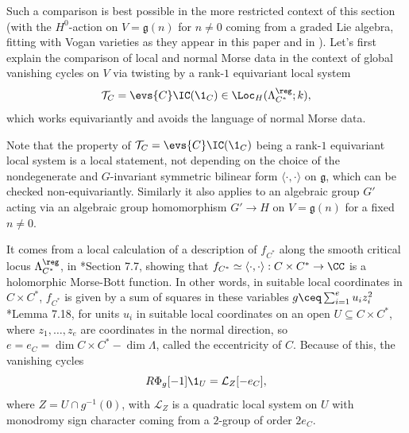 \documentclass[11pt,letterpaper]{amsart}
\numberwithin{equation}{section}
\begin{document}
Such a comparison is best possible in the more restricted context of this section
(with the $H^0$-action on $V= \mathfrak{g}(n)$ for $n \ne 0$ coming from a graded Lie algebra, fitting with Vogan varieties as they appear in this paper and in \cite{CFMMX22}).
Let's first explain the comparison of local and normal Morse data in the context of global vanishing cycles on $V$ via twisting by a rank-$1$ equivariant local system
\begin{equation}\label{twisting-loc}
\mathcal{T}_{C}
=
\evs{C}\IC(\1_{C}) \in \Loc_{H}(\Lambda_{C^*}^\reg;k),
\end{equation}
which works equivariantly and avoids the language of normal Morse data.
\begin{remark}\label{rem-rank-one}
Note that the property of   $\mathcal{T}_{C} = \evs{C}\IC(\1_{C}) $ being a rank-$1$ equivariant local system
is a local statement, not depending on the choice of the nondegenerate and $G$-invariant symmetric bilinear form $\langle \cdot , \cdot\rangle$ on $\mathfrak{g}$, which can be checked non-equivariantly. Similarly it also applies to an algebraic group $G'$ acting via an algebraic group homomorphism $G'\to H$ on $V=\mathfrak{g}(n)$ for a fixed $n\ne 0$.
\end{remark}

It comes from a local calculation of a description of $f_{C^*}$ along the smooth critical locus $\Lambda_{C^*}^\reg$, in \cite{CFMMX22}*{Section 7.7}, showing that $f_{C^*}\simeq \langle \cdot , \cdot\rangle: C\times C^*\to \CC $
is a holomorphic Morse-Bott function.
In other words, in suitable local coordinates in $C\times C^*$,  $f_{C^*}$ is given by a sum of squares in these variables $g \ceq \sum_{i=1}^e u_i z_i^2$ \cite{CFMMX22}*{Lemma 7.18}, for units $u_i$ in suitable local coordinates on an open $U\subseteq C\times C^*$, where $z_1,\ldots, z_e$ are coordinates in the normal direction, so $e =e_C = \dim C\times C^* - \dim \Lambda$, called the eccentricity of $C$. 
Because of this, the vanishing cycles
\[
R\Phi_{g}[-1] \1_{U}
= \mathcal{L}_{Z}[-e_C],
\]
where $Z = U \cap g^{-1}(0)$, 
with $\mathcal{L}_{Z}$ is a quadratic local system on $U$ with monodromy sign character coming from a $2$-group of order $2e_C$. 
\end{document}
